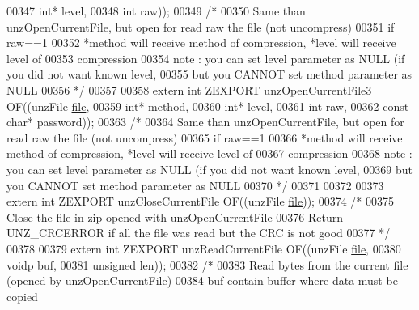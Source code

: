 \begin{DoxyCode}
00347                                            \textcolor{keywordtype}{int}* level,
00348                                            \textcolor{keywordtype}{int} raw));
00349 \textcolor{comment}{/*}
00350 \textcolor{comment}{  Same than unzOpenCurrentFile, but open for read raw the file (not uncompress)}
00351 \textcolor{comment}{    if raw==1}
00352 \textcolor{comment}{  *method will receive method of compression, *level will receive level of}
00353 \textcolor{comment}{     compression}
00354 \textcolor{comment}{  note : you can set level parameter as NULL (if you did not want known level,}
00355 \textcolor{comment}{         but you CANNOT set method parameter as NULL}
00356 \textcolor{comment}{*/}
00357 
00358 \textcolor{keyword}{extern} \textcolor{keywordtype}{int} ZEXPORT unzOpenCurrentFile3 OF((unzFile \hyperlink{structfile}{file},
00359                                            \textcolor{keywordtype}{int}* method,
00360                                            \textcolor{keywordtype}{int}* level,
00361                                            \textcolor{keywordtype}{int} raw,
00362                                            \textcolor{keyword}{const} \textcolor{keywordtype}{char}* password));
00363 \textcolor{comment}{/*}
00364 \textcolor{comment}{  Same than unzOpenCurrentFile, but open for read raw the file (not uncompress)}
00365 \textcolor{comment}{    if raw==1}
00366 \textcolor{comment}{  *method will receive method of compression, *level will receive level of}
00367 \textcolor{comment}{     compression}
00368 \textcolor{comment}{  note : you can set level parameter as NULL (if you did not want known level,}
00369 \textcolor{comment}{         but you CANNOT set method parameter as NULL}
00370 \textcolor{comment}{*/}
00371 
00372 
00373 \textcolor{keyword}{extern} \textcolor{keywordtype}{int} ZEXPORT unzCloseCurrentFile OF((unzFile \hyperlink{structfile}{file}));
00374 \textcolor{comment}{/*}
00375 \textcolor{comment}{  Close the file in zip opened with unzOpenCurrentFile}
00376 \textcolor{comment}{  Return UNZ\_CRCERROR if all the file was read but the CRC is not good}
00377 \textcolor{comment}{*/}
00378 
00379 \textcolor{keyword}{extern} \textcolor{keywordtype}{int} ZEXPORT unzReadCurrentFile OF((unzFile \hyperlink{structfile}{file},
00380                       voidp buf,
00381                       \textcolor{keywordtype}{unsigned} len));
00382 \textcolor{comment}{/*}
00383 \textcolor{comment}{  Read bytes from the current file (opened by unzOpenCurrentFile)}
00384 \textcolor{comment}{  buf contain buffer where data must be copied}

\end{DoxyCode}
